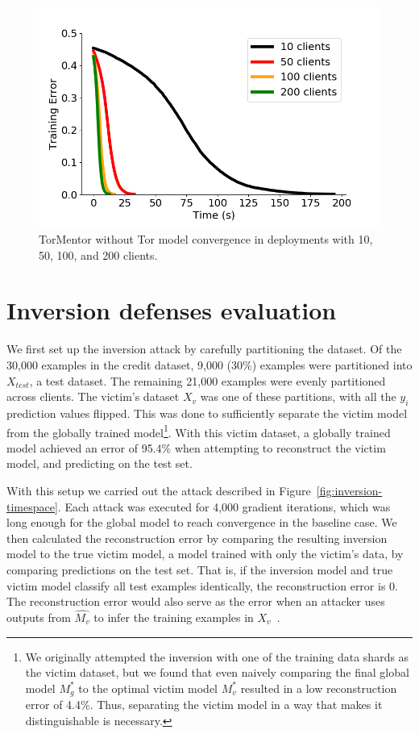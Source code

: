 \begin{figure}[t]
	\includegraphics[width=\linewidth]{fig/withouttor}
	\caption{TorMentor without Tor model convergence in deployments with 10, 50,
          100, and 200 clients.
        }
	\label{fig:without}
\end{figure}

\section{Inversion defenses evaluation}
\label{eval:inversion}

We first set up the inversion attack by carefully partitioning the
dataset. Of the 30,000 examples in the credit dataset, 9,000 (30\%)
examples were partitioned into $X_{test}$, a test dataset. The
remaining 21,000 examples were evenly partitioned across clients.
The victim's dataset $X_v$ was one of these partitions, with
all the $y_i$ prediction values flipped. This was done to
sufficiently separate the victim model from the globally trained
model\footnote{We originally attempted the inversion with one of the training data
shards as the victim dataset, but we found that even naively comparing
the final global model $M^*_g$ to the optimal victim model $M^*_v$
resulted in a low reconstruction error of 4.4\%. Thus, separating the
victim model in a way that makes it distinguishable is necessary.}. With
this victim dataset, a globally trained model achieved an error of
95.4\% when attempting to reconstruct the victim model, and predicting
on the test set.

With this setup we carried out the attack described in
Figure~\ref{fig:inversion-timespace}. Each attack was
executed for 4,000 gradient iterations, which was long enough for the
global model to reach convergence in the baseline case. We then
calculated the reconstruction error by comparing the resulting
inversion model to the true victim model, a model trained with only the
victim's data, by comparing predictions on the test set. That is, if
the inversion model and true victim model classify all test examples
identically, the reconstruction error is 0. The reconstruction error
would also serve as the error when an attacker uses outputs from
$\hat{M_v}$ to infer the training examples in $X_v$~\cite{Tramer:2016,
Fredrikson:2015}.

